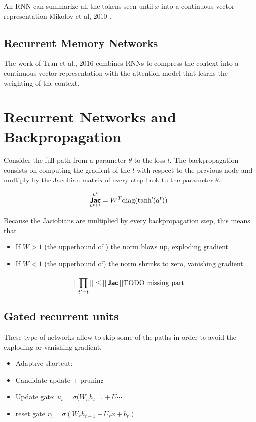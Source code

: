 An RNN can summarize all the tokens seen until $x$ into a continuous vector
representation Mikolov et al, 2010 \cite{mikolov2010recurrent}.

\subsection{Recurrent Memory Networks}

The work of Tran et al., 2016 \cite{tran2016recurrent} combines RNNs to compress the context into a
continuous vector representation with the attention model that learns the
weighting of the context.

\section{Recurrent Networks and Backpropagation}

Consider the full path from a parameter $\theta$ to the loss $l$. The
backpropagation consists on computing the gradient of the $l$ with respect to
the previous node and multiply by the Jacobian matrix of every step back to the
parameter $\theta$.

\begin{equation}
  \operatorname*{\bm{\mathsf{Jac}}}_{h^{t+1}}^{h^t} = W^T \text{diag}(\tanh'(a^t))
\end{equation}

Because the Jaciobians are multiplied by every backpropagation step, this means
that

\begin{itemize}
  \item If $W > 1$ (the upperbound of ) the norm blows up, exploding gradient
  \item If $W < 1$ (the upperbound of) the norm shrinks to zero, vanishing
    gradient
\end{itemize}

\begin{equation}
  || \prod_{t'=t}^{} || \le  || \operatorname*{\bm{\mathsf{Jac}}} || \text{TODO missing part}
\end{equation}

\subsection{Gated recurrent units}

These type of networks allow to skip some of the paths in order to avoid the
exploding or vanishing gradient.

\begin{itemize}
  \item Adaptive shortcut:
  \item Candidate update + pruning
  \item Update gate: $u_t = \sigma(W_uh_{t-1} + U \cdots$
  \item reset gate $r_t = \sigma(W_rh_{t-1} + U_rx + b_r)$
\end{itemize}


